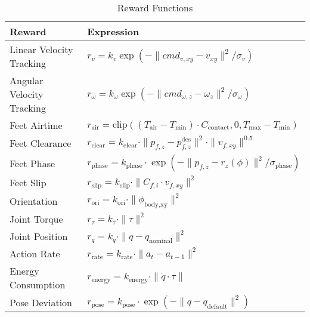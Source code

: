 \begin{table}[h!]
\centering
\caption{Reward Functions}
\label{table:reward-functions}
\begin{tabular}{|l|l|}
\hline
\textbf{Reward}                  & \textbf{Expression}                                                                                         \\ \hline
Linear Velocity Tracking         & $r_v = k_v \exp\left(-\|cmd_{v,xy} - v_{xy}\|^2 / \sigma_v\right)$                                          \\ \hline
Angular Velocity Tracking        & $r_\omega = k_\omega \exp\left(-\|cmd_{\omega,z} - \omega_z\|^2 / \sigma_\omega\right)$                     \\ \hline
Feet Airtime                     & $r_\text{air} = \text{clip}\left((T_\text{air} - T_\text{min}) \cdot C_\text{contact}, 0, T_\text{max} - T_\text{min}\right)$ \\ \hline
Feet Clearance                   & $r_\text{clear} = k_\text{clear} \cdot \|p_{f,z} - p^\text{des}_{f,z}\|^2 \cdot \|v_{f,xy}\|^{0.5}$          \\ \hline
Feet Phase                       & $r_\text{phase} = k_\text{phase} \cdot \exp\left(-\|p_{f,z} - r_z(\phi)\|^2 / \sigma_\text{phase}\right)$    \\ \hline
Feet Slip                        & $r_\text{slip} = k_\text{slip} \cdot \|C_{f,i} \cdot v_{f,xy}\|^2$                                          \\ \hline
Orientation                      & $r_\text{ori} = k_\text{ori} \cdot \| \phi_\text{body,xy}\|^2$                                              \\ \hline
Joint Torque                     & $r_\tau = k_\tau \cdot \|\tau\|^2$                                                                         \\ \hline
Joint Position                   & $r_q = k_q \cdot \|q - q_\text{nominal}\|^2$                                                               \\ \hline
Action Rate                      & $r_\text{rate} = k_\text{rate} \cdot \|a_t - a_{t-1}\|^2$                                                  \\ \hline
Energy Consumption               & $r_\text{energy} = k_\text{energy} \cdot \|\dot{q} \cdot \tau\|$                                           \\ \hline
Pose Deviation                   & $r_\text{pose} = k_\text{pose} \cdot \exp\left(-\|q - q_\text{default}\|^2\right)$                         \\ \hline

\end{tabular}
\end{table}
